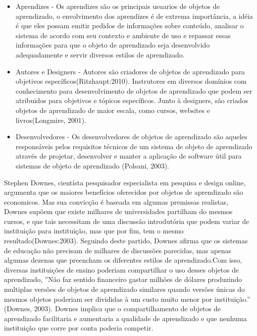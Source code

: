 \documentclass[12pt,openright,oneside,a4paper,english,french,spanish,brazil]{unifil}
\begin{document}
\begin{itemize}
\item Aprendizes - Os aprendizes são os principais usuarios de objetos de aprendizado, o envolvimento dos aprendizes é de extrema importância, a idéia é que eles possam emitir pedidos de informações sobre conteúdo, analisar o sistema de acordo com seu contexto e ambiente de uso e repassar essas informações para que o objeto de aprendizado seja desenvolvido adequadamente e servir diversos estilos de aprendizado.
\item Autores e Designers - Autores são criadores de objetos de aprendizado para objetivos específicos(Ritzhaupt:2010). Instrutores em diversos domínios com conhecimento para desenvolvimento de objetos de aprendizado que podem ser atribuidos para objetivos e tópicos específicos. Junto à designers, são criados objetos de aprendizado de maior escala, como cursos, websites e livros(Longmire, 2001).
\item Desenvolvedores - Os desenvolvedores de objetos de aprendizado são aqueles responsáveis pelos requisitos técnicos de um sistema de objeto de aprendizado através de projetar, desenvolver e manter a aplicação de software útil para sistemas de objeto de aprendizado (Polsani, 2003). 
\end{itemize}

Stephen Downes, cientísta pesquisador especialista em pesquisa e design online, argumenta que os maiores benefícios oferecidos por objetos de aprendizado são economicos. Mas sua convicção é baseada em algumas premissas realistas, Downes supõem que existe milhares de universidades partilham do mesmos cursos, e que tais necessitam de uma discussão introdutória que podem variar de instituição para instituição, mas que por fim, tem o mesmo resultado(Downes:2003). Seguindo deste partido, Downes afirma que os sistemas de educação não precisam de milhares de discussões parecidas, mas apenas algumas dezenas que preencham os diferentes estilos de aprendizado.Com isso, diversas instituições de ensino poderiam compartilhar o uso desses objetos de aprendizado, ''Não faz sentido financeiro gastar milhões de dólares produzindo multiplas versões de objetos de aprendizado similares quando versões únicas do mesmos objetos poderiam ser divididas à um custo muito menor por instituição.'' (Downes, 2003). Downes implica que o compartilhamento de objetos de aprendizado facilitaria e aumentaria a qualidade de aprendizado e que nenhuma instituição que corre por conta poderia competir.
\end{document}
